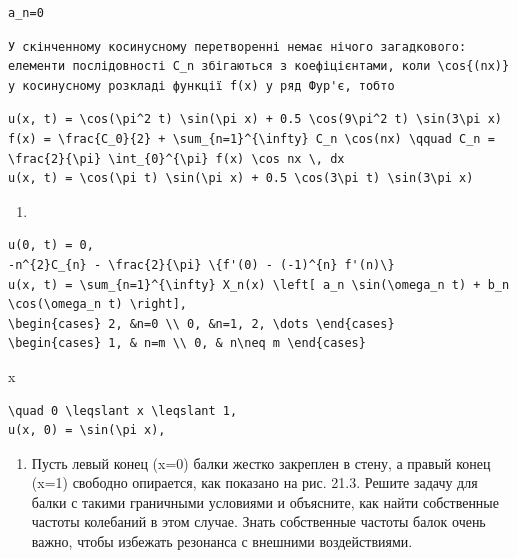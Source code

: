 \documentclass[
  ukrainian,
]{article}
\providecommand{\tightlist}{%
  \setlength{\itemsep}{0pt}\setlength{\parskip}{0pt}}
\begin{document}
\begin{verbatim}
a_n=0
\end{verbatim}

\begin{verbatim}
У скінченному косинусному перетворенні немає нічого загадкового: елементи послідовності C_n збігаються з коефіцієнтами, коли \cos{(nx)} у косинусному розкладі функції f(x) у ряд Фур'є, тобто
\end{verbatim}

\begin{verbatim}
u(x, t) = \cos(\pi^2 t) \sin(\pi x) + 0.5 \cos(9\pi^2 t) \sin(3\pi x)
f(x) = \frac{C_0}{2} + \sum_{n=1}^{\infty} C_n \cos(nx) \qquad C_n = \frac{2}{\pi} \int_{0}^{\pi} f(x) \cos nx \, dx
u(x, t) = \cos(\pi t) \sin(\pi x) + 0.5 \cos(3\pi t) \sin(3\pi x)
\end{verbatim}

\begin{enumerate}
\def\labelenumi{\arabic{enumi}.}
\tightlist
\item
\end{enumerate}

\begin{verbatim}
u(0, t) = 0,
-n^{2}C_{n} - \frac{2}{\pi} \{f'(0) - (-1)^{n} f'(n)\}
u(x, t) = \sum_{n=1}^{\infty} X_n(x) \left[ a_n \sin(\omega_n t) + b_n \cos(\omega_n t) \right],
\begin{cases} 2, &n=0 \\ 0, &n=1, 2, \dots \end{cases}
\begin{cases} 1, & n=m \\ 0, & n\neq m \end{cases}
\end{verbatim}

x

\begin{verbatim}
\quad 0 \leqslant x \leqslant 1,
u(x, 0) = \sin(\pi x),
\end{verbatim}

\begin{enumerate}
\def\labelenumi{\arabic{enumi}.}
\setcounter{enumi}{3}
\tightlist
\item
  Пусть левый конец (x=0) балки жестко закреплен в стену, а правый конец
  (x=1) свободно опирается, как показано на рис. 21.3. Решите задачу для
  балки с такими граничными условиями и объясните, как найти собственные
  частоты колебаний в этом случае. Знать собственные частоты балок очень
  важно, чтобы избежать резонанса с внешними воздействиями.
\end{enumerate}
\end{document}
